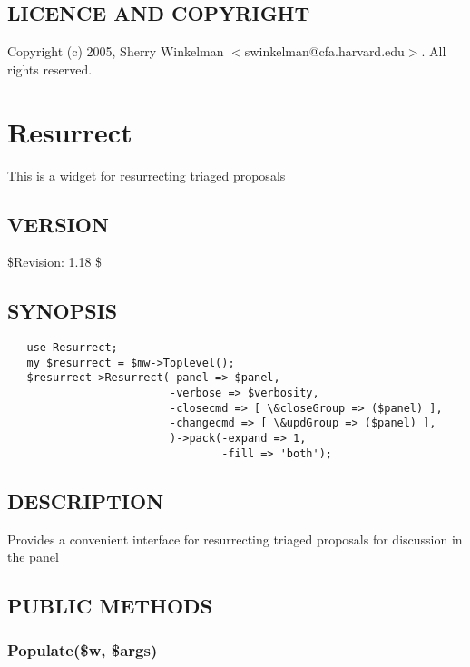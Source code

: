\documentclass{article}
\begin{document}
\subsection*{LICENCE AND COPYRIGHT\label{Proposal_LICENCE_AND_COPYRIGHT}}


Copyright (c) 2005, Sherry Winkelman $<$swinkelman@cfa.harvard.edu$>$. All rights 
reserved.

\clearpage
\section{Resurrect\label{Resurrect}}


This is a widget for resurrecting triaged proposals

\subsection*{VERSION\label{Resurrect_VERSION}}


\$Revision: 1.18 \$

\subsection*{SYNOPSIS\label{Resurrect_SYNOPSIS}}
\begin{verbatim}
   use Resurrect;
   my $resurrect = $mw->Toplevel();
   $resurrect->Resurrect(-panel => $panel,
                         -verbose => $verbosity,
                         -closecmd => [ \&closeGroup => ($panel) ],
                         -changecmd => [ \&updGroup => ($panel) ],
                         )->pack(-expand => 1,
                                 -fill => 'both');
\end{verbatim}
\subsection*{DESCRIPTION\label{Resurrect_DESCRIPTION}}


Provides a convenient interface for resurrecting triaged proposals for 
discussion in the panel

\subsection*{PUBLIC METHODS\label{Resurrect_PUBLIC_METHODS}}
\subsubsection*{Populate(\$w, \$args)\label{Resurrect_Populate_w_args_}}
\end{document}

